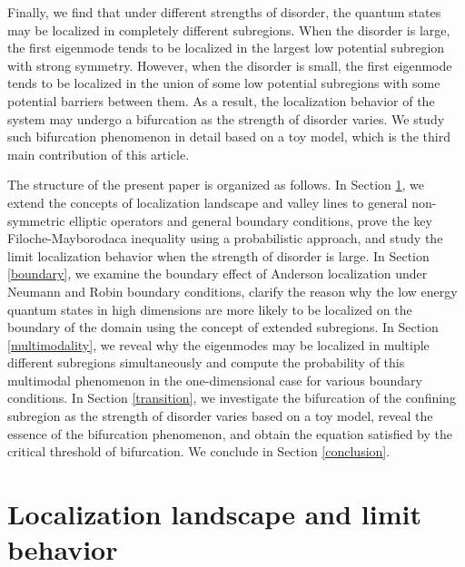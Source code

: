 \documentclass[a4paper,11pt]{article}
\begin{document}
Finally, we find that under different strengths of disorder, the quantum states may be localized in completely different subregions. When the disorder is large, the first eigenmode tends to be localized in the largest low potential subregion with strong symmetry. However, when the disorder is small, the first eigenmode tends to be localized in the union of some low potential subregions with some potential barriers between them. As a result, the localization behavior of the system may undergo a bifurcation as the strength of disorder varies. We study such bifurcation phenomenon in detail based on a toy model, which is the third main contribution of this article.

The structure of the present paper is organized as follows. In Section \ref{model}, we extend the concepts of localization landscape and valley lines to general non-symmetric elliptic operators and general boundary conditions, prove the key Filoche-Mayborodaca inequality using a probabilistic approach, and study the limit localization behavior when the strength of disorder is large. In Section \ref{boundary}, we examine the boundary effect of Anderson localization under Neumann and Robin boundary conditions, clarify the reason why the low energy quantum states in high dimensions are more likely to be localized on the boundary of the domain using the concept of extended subregions. In Section \ref{multimodality}, we reveal why the eigenmodes may be localized in multiple different subregions simultaneously and compute the probability of this multimodal phenomenon in the one-dimensional case for various boundary conditions. In Section \ref{transition}, we investigate the bifurcation of the confining subregion as the strength of disorder varies based on a toy model, reveal the essence of the bifurcation phenomenon, and obtain the equation satisfied by the critical threshold of bifurcation. We conclude in Section \ref{conclusion}.


\section{Localization landscape and limit behavior}\label{model}
\end{document}
